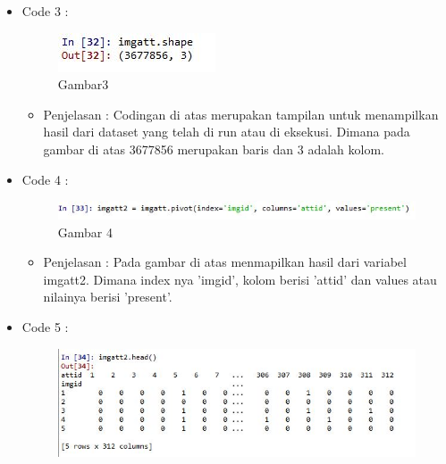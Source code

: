 \begin{enumerate}
\begin{itemize}
\begin{itemize}
\par
\par
\end{itemize}
\item Code  3 :
\par
\begin{figure}[ht]
\centering
\includegraphics[scale=0.7]{figures/pd3.jpg}
\caption{Gambar3}
\label{contoh}
\end{figure}
\par
\begin{itemize}
\item Penjelasan : Codingan di atas merupakan tampilan untuk menampilkan hasil dari dataset yang telah di run atau di eksekusi. Dimana pada gambar di atas 3677856 merupakan baris dan 3 adalah kolom.
\par
\par
\end{itemize}
\item Code 4 :
\par
\begin{figure}[ht]
\centering
\includegraphics[scale=0.7]{figures/pd4.jpg}
\caption{Gambar 4}
\label{contoh}
\end{figure}
\par
\begin{itemize}
\item Penjelasan : Pada gambar di atas menmapilkan hasil dari variabel imgatt2. Dimana index nya 'imgid', kolom berisi 'attid' dan values atau nilainya berisi 'present'.
\par
\par
\end{itemize}
\item Code 5 :
\par
\begin{figure}[ht]
\centering
\includegraphics[scale=0.7]{figures/pd5.jpg}

\end{figure}
\end{itemize}
\end{enumerate}
